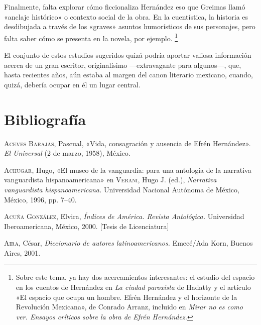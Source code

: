 \documentclass[14pt,twoside,final]{extbook} %
\let\oldfootnote\footnote
\renewcommand\footnote[1]{%
\oldfootnote{\hspace{1mm}#1}}
\begin{document}
Finalmente, falta explorar cómo ficcionaliza Hernández eso que Greimas llamó «anclaje histórico» o contexto social de la obra. En la cuentística, la historia es desdibujada a través de los «graves» asuntos humorísticos de sus personajes, pero falta saber cómo se presenta en la novela, por ejemplo.\footnote{Sobre este tema, ya hay dos acercamientos interesantes: el estudio del espacio en los cuentos de Hernández en \emph{La ciudad paroxista} de Hadatty y el artículo «El espacio que ocupa un hombre. Efrén Hernández y el horizonte de la Revolución Mexicana», de Conrado Arranz, incluido en \emph{Mirar no es como ver. Ensayos críticos sobre la obra de Efrén Hernández.}}

El conjunto de estos estudios sugeridos quizá podría aportar valiosa información acerca de un gran escritor, originalísimo ---extravagante para algunos---, que, hasta recientes años, aún estaba al margen del canon literario mexicano, cuando, quizá, debería ocupar en él un lugar central.
\chapter[\textsc{Bibliografía}]{Bibliografía}\label{ch:bibliografia}
\thispagestyle{empty}
\pagestyle{fancy}
\fancyhf{} %
\fancyhead[RO,LE]{\thepage}
\renewcommand{\headrulewidth}{0pt}
\textsc{Aceves Barajas}, Pascual, «Vida, consagración y ausencia de Efrén Hernández». \emph{El Universal} (2 de marzo, 1958), México.\label{bib:aceves1958}

\textsc{Achugar}, Hugo, «El museo de la vanguardia: para una antología de la narrativa vanguardista hispanoamericana» en \textsc{Verani}, Hugo J. (ed.), \emph{Narrativa vanguardista hispanoamericana.} Universidad Nacional Autónoma de México, México, 1996, pp. 7--40.\label{bib:achugar1996}

\textsc{Acuña González}, Elvira, \emph{Índices de \emph{América. Revista Antológica}.} Universidad Iberoamericana, México, 2000. [Tesis de Licenciatura]\label{bib:acuña2000}

\textsc{Aira}, César, \emph{Diccionario de autores latinoamericanos.} Emecé/Ada Korn, Buenos Aires, 2001.\label{bib:aira2001}
\end{document}
